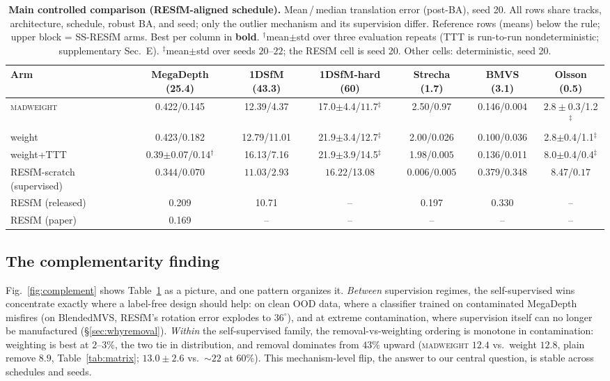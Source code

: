 \documentclass[10pt,twocolumn,letterpaper]{article}
\newcommand{\mad}{\textsc{madweight}}
\renewcommand{\deg}{^{\circ}}             %
\begin{document}
\begin{table}[t]\centering\small
\caption{\textbf{Main controlled comparison (RESfM-aligned schedule).} Mean\,/\,median
translation error (post-BA), seed 20. All rows share tracks, architecture, schedule,
robust BA, and seed; only the outlier mechanism and its supervision differ. Reference rows
(means) below the rule; upper block = SS-RESfM arms. Best per column in \textbf{bold}. $^{\dagger}$mean$\pm$std over
three evaluation repeats (TTT is run-to-run nondeterministic; supplementary Sec.~E).
$^{\ddagger}$mean$\pm$std over seeds $20$--$22$; the RESfM cell is seed 20. Other
cells: deterministic, seed 20.}
\label{tab:main}
\footnotesize\setlength{\tabcolsep}{3pt}%
\begin{tabular}{lcccccc}
\toprule
Arm & MegaDepth (25.4) & 1DSfM (43.3) & 1DSfM-hard (60) & Strecha (1.7) & BMVS (3.1) & Olsson (0.5)\\
\midrule
\mad{}       & 0.422/0.145 & 12.39/4.37 & 17.0$\pm$4.4/$\mathbf{11.7}$$^{\ddagger}$ & 2.50/0.97 & 0.146/$\mathbf{0.004}$ & $\mathbf{2.8\pm 0.3}$/1.2$^{\ddagger}$\\
weight       & 0.423/0.182 & 12.79/11.01 & 21.9$\pm$3.4/12.7$^{\ddagger}$ & 2.00/0.026 & $\mathbf{0.100}$/0.036 & 2.8$\pm$0.4/1.1$^{\ddagger}$\\
weight+TTT   & 0.39$\pm$0.07/0.14$^{\dagger}$ & 16.13/7.16 & 21.9$\pm$3.9/14.5$^{\ddagger}$ & 1.98/$\mathbf{0.005}$ & 0.136/0.011 & 8.0$\pm$0.4/0.4$^{\ddagger}$\\
RESfM-scratch (supervised)  & $\mathbf{0.344/0.070}$ & $\mathbf{11.03/2.93}$ & $\mathbf{16.22}$/13.08 & $\mathbf{0.006/0.005}$ & 0.379/0.348 & 8.47/$\mathbf{0.17}$\\
\midrule
RESfM (released)            & 0.209 & 10.71 & -- & 0.197 & 0.330 & --\\
RESfM (paper)               & 0.169 & -- & -- & -- & -- & --\\
\bottomrule
\end{tabular}
\end{table}


\subsection{The complementarity finding}
Fig.~\ref{fig:complement} shows Table~\ref{tab:main} as a picture, and one pattern
organizes it. \emph{Between} supervision regimes, the self-supervised wins concentrate
exactly where a label-free design should help: on clean OOD data, where a classifier
trained on contaminated MegaDepth misfires (on BlendedMVS, RESfM's rotation error explodes
to $36\deg$), and at extreme contamination, where supervision itself can no longer be
manufactured (\S\ref{sec:whyremoval}). \emph{Within} the self-supervised family, the
removal-vs-weighting ordering is monotone in contamination: weighting is best at
$2$--$3\%$, the two tie in distribution, and removal dominates from $43\%$ upward
(\mad{} $12.4$ vs.\ weight $12.8$, plain remove $8.9$, Table~\ref{tab:matrix};
$13.0\pm2.6$ vs.\ $\sim\!22$ at $60\%$). This mechanism-level flip, the answer to our central
question, is stable across schedules and seeds.
\end{document}
